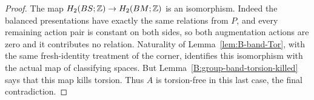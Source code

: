 \begin{proof}
The map $H_2(BS;\mathbb Z)\to H_2(BM;\mathbb Z)$ is an isomorphism. Indeed
the balanced presentations have exactly the same relations from
$P$, and every remaining action pair is constant on both sides,
so both augmentation actions are zero and it contributes no
relation. Naturality of Lemma~\ref{lem:B-band-Tor}, with the same
fresh-identity treatment of the corner, identifies this isomorphism
with the actual map of classifying spaces. But
Lemma~\ref{B:group-band-torsion-killed} says that this map kills
torsion. Thus $A$ is torsion-free in this last case, the final
contradiction.
\end{proof}
